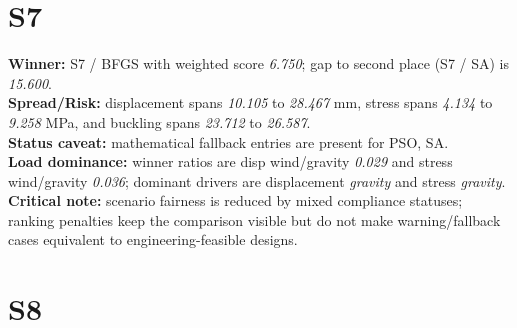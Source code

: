 \section{S7}


\begin{table}[H]
\centering
\scriptsize
\setlength{\tabcolsep}{4pt}
\renewcommand{\arraystretch}{1.1}
\end{table}


\begin{samepage}
\noindent \textbf{Winner:} S7 / BFGS with weighted score \textit{6.750}; gap to second place (S7 / SA) is \textit{15.600}.\\
\noindent \textbf{Spread/Risk:} displacement spans \textit{10.105} to \textit{28.467} mm, stress spans \textit{4.134} to \textit{9.258} MPa, and buckling spans \textit{23.712} to \textit{26.587}.\\
\noindent \textbf{Status caveat:} mathematical fallback entries are present for PSO, SA.\\
\noindent \textbf{Load dominance:} winner ratios are disp wind/gravity \textit{0.029} and stress wind/gravity \textit{0.036}; dominant drivers are displacement \textit{gravity} and stress \textit{gravity}.\\
\noindent \textbf{Critical note:} scenario fairness is reduced by mixed compliance statuses; ranking penalties keep the comparison visible but do not make warning/fallback cases equivalent to engineering-feasible designs.
\end{samepage}


\section{S8}


